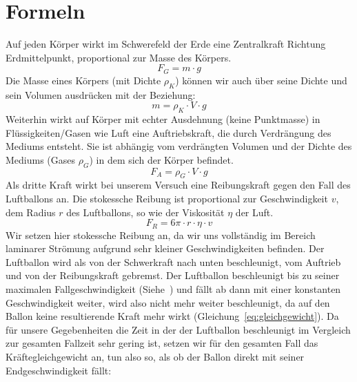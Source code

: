 \documentclass{article}
\begin{document}
    \section{Formeln}
      Auf jeden Körper wirkt im Schwerefeld der Erde eine Zentralkraft Richtung Erdmittelpunkt, proportional zur Masse des Körpers.
      \begin{equation} \label{eq:schwerkraft}
          F_G = m \cdot g
      \end{equation}
      Die Masse eines Körpers (mit Dichte \(\rho_K\)) können wir auch über seine Dichte und sein Volumen ausdrücken mit der Beziehung:
      \begin{equation} \label{eq:masse_dichte_rel}
          m = \rho_K \cdot V \cdot g
      \end{equation}
      Weiterhin wirkt auf Körper mit echter Ausdehnung (keine Punktmasse) in Flüssigkeiten/Gasen wie Luft eine Auftriebskraft,
      die durch Verdrängung des Mediums entsteht. Sie ist abhängig vom verdrängten Volumen und der Dichte des Mediums (Gases \(\rho_G\)) in dem sich der Körper befindet.
      \begin{equation} \label{eq:auftrieb}
          F_A = \rho_{G} \cdot V \cdot g
      \end{equation}
      Als dritte Kraft wirkt bei unserem Versuch eine Reibungskraft gegen den Fall des Luftballons an.
      Die stokessche Reibung ist proportional zur Geschwindigkeit \(v\), dem Radius \(r\) des Luftballons, so wie der Viskosität \( \eta \) der Luft.
      \begin{equation} \label{eq:stokes_reibung}
          F_R = 6 \pi \cdot r \cdot \eta \cdot v
      \end{equation}
      Wir setzen hier stokessche Reibung an, da wir uns vollständig im Bereich laminarer Strömung aufgrund sehr kleiner Geschwindigkeiten befinden.
      Der Luftballon wird als von der Schwerkraft nach unten beschleunigt, vom Auftrieb und von der Reibungskraft gebremst.
      Der Luftballon beschleunigt bis zu seiner maximalen Fallgeschwindigkeit (Siehe~\cite{Fall-Luftwiederstand}) und fällt ab dann mit einer konstanten Geschwindigkeit weiter,
      wird also nicht mehr weiter beschleunigt, da auf den Ballon keine resultierende Kraft mehr wirkt (Gleichung~\ref{eq:gleichgewicht}).
      Da für unsere Gegebenheiten die Zeit in der der Luftballon beschleunigt im Vergleich zur gesamten Fallzeit sehr gering ist,
      setzen wir für den gesamten Fall das Kräftegleichgewicht an, tun also so, als ob der Ballon direkt mit seiner Endgeschwindigkeit fällt:
\end{document}
